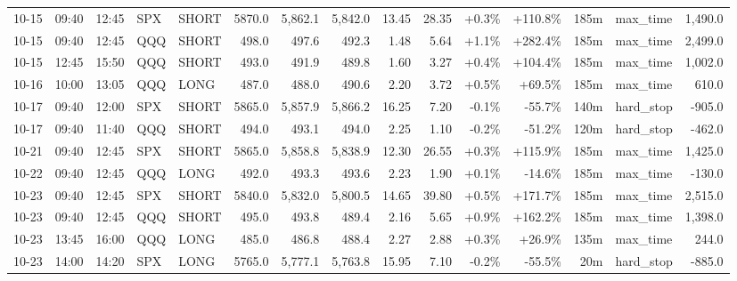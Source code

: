 \documentclass[11pt,a4paper,twoside]{article}
\begin{document}
\begin{landscape}
\begin{center}
\begin{longtable}{>{\color{txtmain}}l l l l l r r r r r r r r >{\color{txtmain}}l r}
10-15 & 09:40 & 12:45 & SPX & SHORT & 5870.0 & 5,862.1 & 5,842.0 & 13.45 & 28.35 & \textcolor{wingreen}{+0.3\%} & \textcolor{wingreen}{+110.8\%} & 185m & max\_time & \textcolor{wingreen}{1,490.0} \\
10-15 & 09:40 & 12:45 & QQQ & SHORT & 498.0 & 497.6 & 492.3 & 1.48 & 5.64 & \textcolor{wingreen}{+1.1\%} & \textcolor{wingreen}{+282.4\%} & 185m & max\_time & \textcolor{wingreen}{2,499.0} \\
10-15 & 12:45 & 15:50 & QQQ & SHORT & 493.0 & 491.9 & 489.8 & 1.60 & 3.27 & \textcolor{wingreen}{+0.4\%} & \textcolor{wingreen}{+104.4\%} & 185m & max\_time & \textcolor{wingreen}{1,002.0} \\
10-16 & 10:00 & 13:05 & QQQ & LONG & 487.0 & 488.0 & 490.6 & 2.20 & 3.72 & \textcolor{wingreen}{+0.5\%} & \textcolor{wingreen}{+69.5\%} & 185m & max\_time & \textcolor{wingreen}{610.0} \\
10-17 & 09:40 & 12:00 & SPX & SHORT & 5865.0 & 5,857.9 & 5,866.2 & 16.25 & 7.20 & \textcolor{lossred}{-0.1\%} & \textcolor{lossred}{-55.7\%} & 140m & hard\_stop & \textcolor{lossred}{-905.0} \\
10-17 & 09:40 & 11:40 & QQQ & SHORT & 494.0 & 493.1 & 494.0 & 2.25 & 1.10 & \textcolor{lossred}{-0.2\%} & \textcolor{lossred}{-51.2\%} & 120m & hard\_stop & \textcolor{lossred}{-462.0} \\
10-21 & 09:40 & 12:45 & SPX & SHORT & 5865.0 & 5,858.8 & 5,838.9 & 12.30 & 26.55 & \textcolor{wingreen}{+0.3\%} & \textcolor{wingreen}{+115.9\%} & 185m & max\_time & \textcolor{wingreen}{1,425.0} \\
10-22 & 09:40 & 12:45 & QQQ & LONG & 492.0 & 493.3 & 493.6 & 2.23 & 1.90 & \textcolor{wingreen}{+0.1\%} & \textcolor{lossred}{-14.6\%} & 185m & max\_time & \textcolor{lossred}{-130.0} \\
10-23 & 09:40 & 12:45 & SPX & SHORT & 5840.0 & 5,832.0 & 5,800.5 & 14.65 & 39.80 & \textcolor{wingreen}{+0.5\%} & \textcolor{wingreen}{+171.7\%} & 185m & max\_time & \textcolor{wingreen}{2,515.0} \\
10-23 & 09:40 & 12:45 & QQQ & SHORT & 495.0 & 493.8 & 489.4 & 2.16 & 5.65 & \textcolor{wingreen}{+0.9\%} & \textcolor{wingreen}{+162.2\%} & 185m & max\_time & \textcolor{wingreen}{1,398.0} \\
10-23 & 13:45 & 16:00 & QQQ & LONG & 485.0 & 486.8 & 488.4 & 2.27 & 2.88 & \textcolor{wingreen}{+0.3\%} & \textcolor{wingreen}{+26.9\%} & 135m & max\_time & \textcolor{wingreen}{244.0} \\
10-23 & 14:00 & 14:20 & SPX & LONG & 5765.0 & 5,777.1 & 5,763.8 & 15.95 & 7.10 & \textcolor{lossred}{-0.2\%} & \textcolor{lossred}{-55.5\%} & 20m & hard\_stop & \textcolor{lossred}{-885.0} \\

\end{longtable}
\end{center}
\end{landscape}
\end{document}
